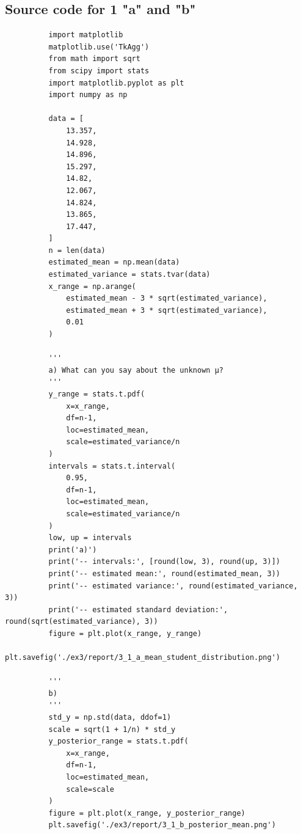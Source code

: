 \documentclass[11pt,a4paper,english]{article}
\begin{document}
      \begin{appendices}
        \section{Source code for 1 "a" and "b"}
        \begin{verbatim}
          import matplotlib
          matplotlib.use('TkAgg')
          from math import sqrt
          from scipy import stats
          import matplotlib.pyplot as plt
          import numpy as np

          data = [
              13.357,
              14.928,
              14.896,
              15.297,
              14.82,
              12.067,
              14.824,
              13.865,
              17.447,
          ]
          n = len(data)
          estimated_mean = np.mean(data)
          estimated_variance = stats.tvar(data)
          x_range = np.arange(
              estimated_mean - 3 * sqrt(estimated_variance),
              estimated_mean + 3 * sqrt(estimated_variance),
              0.01
          )

          '''
          a) What can you say about the unknown μ?
          '''
          y_range = stats.t.pdf(
              x=x_range,
              df=n-1,
              loc=estimated_mean,
              scale=estimated_variance/n
          )
          intervals = stats.t.interval(
              0.95,
              df=n-1,
              loc=estimated_mean,
              scale=estimated_variance/n
          )
          low, up = intervals
          print('a)')
          print('-- intervals:', [round(low, 3), round(up, 3)])
          print('-- estimated mean:', round(estimated_mean, 3))
          print('-- estimated variance:', round(estimated_variance, 3))
          print('-- estimated standard deviation:', round(sqrt(estimated_variance), 3))
          figure = plt.plot(x_range, y_range)
          plt.savefig('./ex3/report/3_1_a_mean_student_distribution.png')

          '''
          b)
          '''
          std_y = np.std(data, ddof=1)
          scale = sqrt(1 + 1/n) * std_y
          y_posterior_range = stats.t.pdf(
              x=x_range,
              df=n-1,
              loc=estimated_mean,
              scale=scale
          )
          figure = plt.plot(x_range, y_posterior_range)
          plt.savefig('./ex3/report/3_1_b_posterior_mean.png')
        \end{verbatim}
      \end{appendices}
\end{document}
